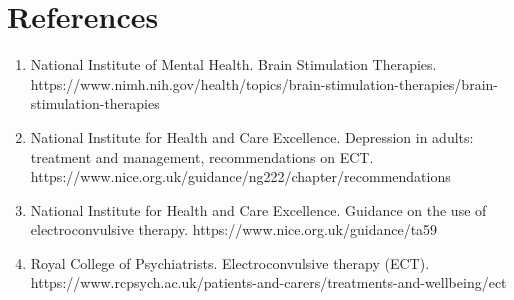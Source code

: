 \section*{References}
\begin{enumerate}
  \item National Institute of Mental Health. Brain Stimulation Therapies. https://www.nimh.nih.gov/health/topics/brain-stimulation-therapies/brain-stimulation-therapies
  \item National Institute for Health and Care Excellence. Depression in adults: treatment and management, recommendations on ECT. https://www.nice.org.uk/guidance/ng222/chapter/recommendations
  \item National Institute for Health and Care Excellence. Guidance on the use of electroconvulsive therapy. https://www.nice.org.uk/guidance/ta59
  \item Royal College of Psychiatrists. Electroconvulsive therapy (ECT). https://www.rcpsych.ac.uk/patients-and-carers/treatments-and-wellbeing/ect
\end{enumerate}

\clearpage
